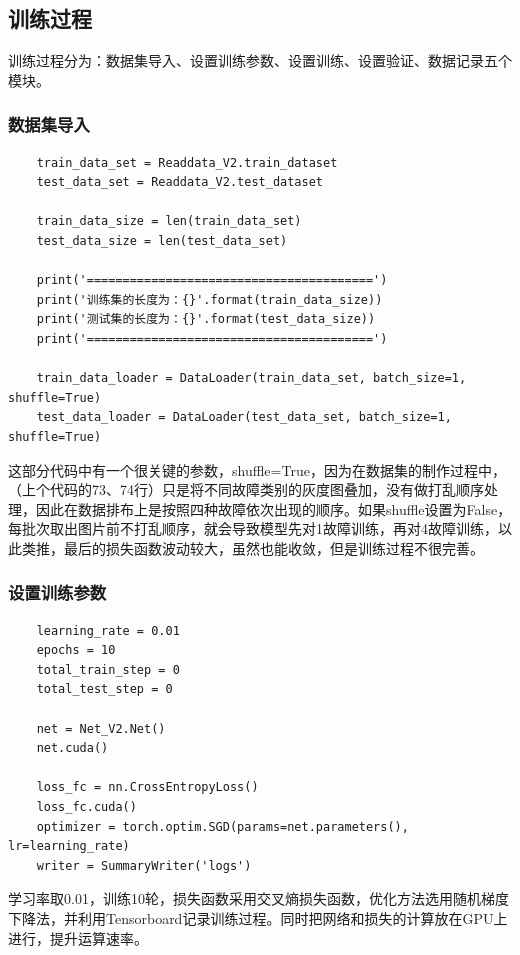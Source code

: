 \documentclass{article}
\begin{document}
	\subsection{训练过程}
	
	训练过程分为：数据集导入、设置训练参数、设置训练、设置验证、数据记录五个模块。
	
	\subsubsection{数据集导入}
	
	\begin{lstlisting}
	train_data_set = Readdata_V2.train_dataset
	test_data_set = Readdata_V2.test_dataset
	
	train_data_size = len(train_data_set)
	test_data_size = len(test_data_set)
	
	print('========================================')
	print('训练集的长度为：{}'.format(train_data_size))
	print('测试集的长度为：{}'.format(test_data_size))
	print('========================================')
	
	train_data_loader = DataLoader(train_data_set, batch_size=1, shuffle=True)
	test_data_loader = DataLoader(test_data_set, batch_size=1, shuffle=True)
	\end{lstlisting}

	这部分代码中有一个很关键的参数，shuffle=True，因为在数据集的制作过程中，（上个代码的73、74行）只是将不同故障类别的灰度图叠加，没有做打乱顺序处理，因此在数据排布上是按照四种故障依次出现的顺序。如果shuffle设置为False，每批次取出图片前不打乱顺序，就会导致模型先对1故障训练，再对4故障训练，以此类推，最后的损失函数波动较大，虽然也能收敛，但是训练过程不很完善。
	
	\subsubsection{设置训练参数}
	
	\begin{lstlisting}
	learning_rate = 0.01
	epochs = 10
	total_train_step = 0
	total_test_step = 0
	
	net = Net_V2.Net()
	net.cuda()
	
	loss_fc = nn.CrossEntropyLoss()
	loss_fc.cuda()
	optimizer = torch.optim.SGD(params=net.parameters(), lr=learning_rate)
	writer = SummaryWriter('logs')
	\end{lstlisting}

	学习率取0.01，训练10轮，损失函数采用交叉熵损失函数，优化方法选用随机梯度下降法，并利用Tensorboard记录训练过程。同时把网络和损失的计算放在GPU上进行，提升运算速率。
	
\end{document}
